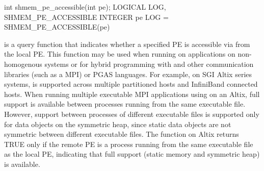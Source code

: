 \synC     
int shmem_pe_accessible(int pe);
\synF
LOGICAL LOG, SHMEM_PE_ACCESSIBLE
INTEGER pe
LOG = SHMEM_PE_ACCESSIBLE(pe)

{
        is  a  query function  that indicates  whether  a
       specified \ac{PE} is accessible via \openshmem from the local \ac{PE}. This function
       may be used when running on \openshmem applications on non-homogenous systems or for hybrid programming
       with \openshmem and other communication libraries (such as a \ac{MPI}) or \ac{PGAS} languages. 
       For example, on  SGI Altix  series  systems, \openshmem is  supported  across multiple
       partitioned hosts and InfiniBand connected hosts. When running multiple executable MPI applications using \openshmem on an Altix,
       full \openshmem support is available between processes running from the same
       executable file. However, \openshmem support between processes of different
       executable  files  is  supported only for data objects on the symmetric
       heap, since static data objects are  not symmetric  between  different
       executable  files. The  function on Altix returns
       TRUE only if  the  remote  \ac{PE}  is  a  process  running  from  the  same
       executable  file	 as  the  local \ac{PE}, indicating that full \openshmem support
       (static memory and symmetric heap) is available.
}
{

}

\eAPI